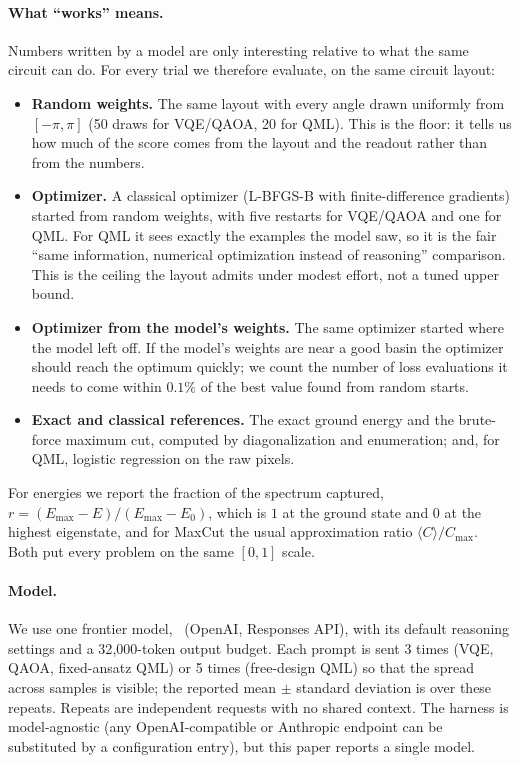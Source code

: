\paragraph{What ``works'' means.}
Numbers written by a model are only interesting relative to what the same circuit can do. For every trial we therefore evaluate, on the same circuit layout:
\begin{itemize}
  \item \textbf{Random weights.} The same layout with every angle drawn uniformly from $[-\pi, \pi]$ (50 draws for VQE/QAOA, 20 for QML). This is the floor: it tells us how much of the score comes from the layout and the readout rather than from the numbers.
  \item \textbf{Optimizer.} A classical optimizer (L-BFGS-B with finite-difference gradients) started from random weights, with five restarts for VQE/QAOA and one for QML. For QML it sees exactly the examples the model saw, so it is the fair ``same information, numerical optimization instead of reasoning'' comparison. This is the ceiling the layout admits under modest effort, not a tuned upper bound.
  \item \textbf{Optimizer from the model's weights.} The same optimizer started where the model left off. If the model's weights are near a good basin the optimizer should reach the optimum quickly; we count the number of loss evaluations it needs to come within $0.1\%$ of the best value found from random starts.
  \item \textbf{Exact and classical references.} The exact ground energy and the brute-force maximum cut, computed by diagonalization and enumeration; and, for QML, logistic regression on the raw pixels.
\end{itemize}
For energies we report the fraction of the spectrum captured, $r = (E_{\max} - E)/(E_{\max} - E_0)$, which is $1$ at the ground state and $0$ at the highest eigenstate, and for MaxCut the usual approximation ratio $\langle C \rangle / C_{\max}$. Both put every problem on the same $[0, 1]$ scale.

\paragraph{Model.}
We use one frontier model, \gpt\ (OpenAI, Responses API), with its default reasoning settings and a 32{,}000-token output budget. Each prompt is sent 3 times (VQE, QAOA, fixed-ansatz QML) or 5 times (free-design QML) so that the spread across samples is visible; the reported mean $\pm$ standard deviation is over these repeats. Repeats are independent requests with no shared context. The harness is model-agnostic (any OpenAI-compatible or Anthropic endpoint can be substituted by a configuration entry), but this paper reports a single model.
